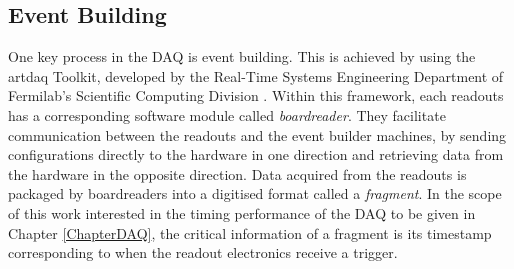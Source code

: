 
\subsection{Event Building}
\label{sec:evb}

One key process in the DAQ is event building.
This is achieved by using the artdaq Toolkit, developed by the Real-Time Systems Engineering Department of Fermilab's Scientific Computing Division \cite{artdaq_note}. 
Within this framework, each readouts has a corresponding software module called \textit{boardreader}.
They facilitate communication between the readouts and the event builder machines, by sending configurations directly to the hardware in one direction and retrieving data from the hardware in the opposite direction.
Data acquired from the readouts is packaged by boardreaders into a digitised format called a \textit{fragment}.
In the scope of this work interested in the timing  performance of the DAQ to be given in Chapter \ref{ChapterDAQ}, the critical information of a fragment is its timestamp corresponding to when the readout electronics receive a trigger.




